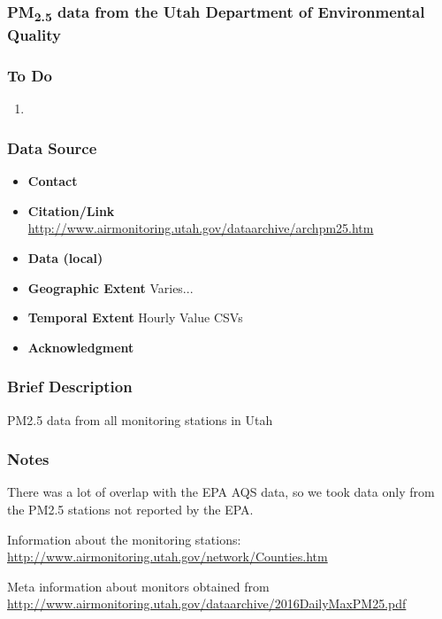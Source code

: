 \subsubsection{\texorpdfstring{PM\textsubscript{2.5}}{} data from the Utah Department of Environmental Quality }

\subsubsection*{To Do}
\begin{enumerate}
\item 
\end{enumerate}

\subsubsection*{Data Source}

\begin{itemize}[nolistsep]
\item \textbf{Contact} 
\item \textbf{Citation/Link} \url{http://www.airmonitoring.utah.gov/dataarchive/archpm25.htm}
\item \textbf{Data (local)} 
\item \textbf{Geographic Extent} Varies... 
\item \textbf{Temporal Extent} Hourly Value CSVs
\item \textbf{Acknowledgment} 
\end{itemize}

\subsubsection*{Brief Description} 
PM2.5 data from all monitoring stations in Utah

\subsubsection*{Notes} 
There was a lot of overlap with the EPA AQS data, so we took data only from the PM2.5 stations not reported by the EPA. 

Information about the monitoring stations: \url{ http://www.airmonitoring.utah.gov/network/Counties.htm } 

Meta information about monitors obtained from \url{http://www.airmonitoring.utah.gov/dataarchive/2016DailyMaxPM25.pdf}


